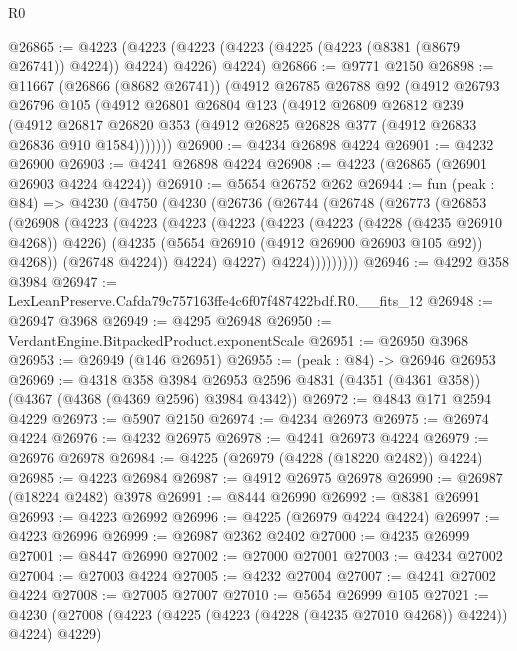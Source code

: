 \begin{lexlean}{R0}
\begin{coremodule}
@26865 := @4223
    (@4223 (@4223 (@4223 (@4225 (@4223 (@8381 (@8679 @26741)) @4224)) @4224) @4226) @4224)
@26866 := @9771 @2150
@26898 := @11667
    (@26866 (@8682 @26741))
    (@4912
      @26785
      @26788
      @92
      (@4912
        @26793
        @26796
        @105
        (@4912
          @26801
          @26804
          @123
          (@4912
            @26809
            @26812
            @239
            (@4912
              @26817
              @26820
              @353
              (@4912 @26825 @26828 @377 (@4912 @26833 @26836 @910 @1584)))))))
@26900 := @4234 @26898 @4224
@26901 := @4232 @26900
@26903 := @4241 @26898 @4224
@26908 := @4223 (@26865 (@26901 @26903 @4224 @4224))
@26910 := @5654 @26752 @262
@26944 := fun (peak : @84) =>
  @4230
    (@4750
      (@4230
        (@26736
          (@26744
            (@26748
              (@26773
                (@26853
                  (@26908
                    (@4223
                      (@4223
                        (@4223
                          (@4223
                            (@4223
                              (@4223 (@4228 (@4235 @26910 @4268)) @4226)
                              (@4235 (@5654 @26910 (@4912 @26900 @26903 @105 @92)) @4268))
                            (@26748 @4224))
                          @4224)
                        @4227)
                      @4224)))))))))
@26946 := @4292 @358 @3984
@26947 := LexLeanPreserve.Cafda79c757163ffe4c6f07f487422bdf.R0.__fits_12
@26948 := @26947 @3968
@26949 := @4295 @26948
@26950 := VerdantEngine.BitpackedProduct.exponentScale
@26951 := @26950 @3968
@26953 := @26949 (@146 @26951)
@26955 := (peak : @84) -> @26946 @26953
@26969 := @4318
    @358
    @3984
    @26953
    @2596
    @4831
    (@4351 (@4361 @358))
    (@4367 (@4368 (@4369 @2596) @3984 @4342))
@26972 := @4843 @171 @2594 @4229
@26973 := @5907 @2150
@26974 := @4234 @26973
@26975 := @26974 @4224
@26976 := @4232 @26975
@26978 := @4241 @26973 @4224
@26979 := @26976 @26978
@26984 := @4225 (@26979 (@4228 (@18220 @2482)) @4224)
@26985 := @4223 @26984
@26987 := @4912 @26975 @26978
@26990 := @26987 (@18224 @2482) @3978
@26991 := @8444 @26990
@26992 := @8381 @26991
@26993 := @4223 @26992
@26996 := @4225 (@26979 @4224 @4224)
@26997 := @4223 @26996
@26999 := @26987 @2362 @2402
@27000 := @4235 @26999
@27001 := @8447 @26990
@27002 := @27000 @27001
@27003 := @4234 @27002
@27004 := @27003 @4224
@27005 := @4232 @27004
@27007 := @4241 @27002 @4224
@27008 := @27005 @27007
@27010 := @5654 @26999 @105
@27021 := @4230 (@27008 (@4223 (@4225 (@4223 (@4228 (@4235 @27010 @4268)) @4224)) @4224) @4229)

\end{coremodule}
\end{lexlean}
